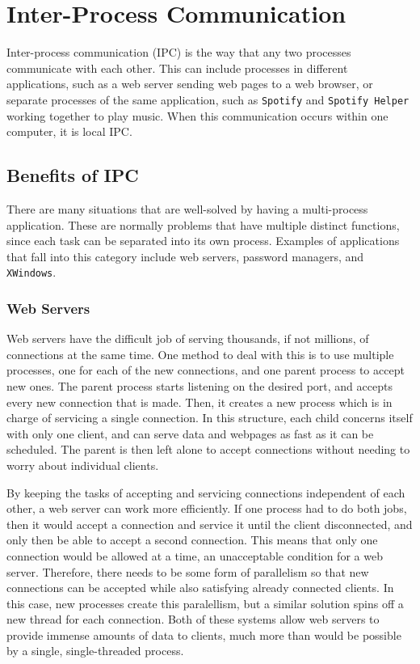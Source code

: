 \chapter{Inter-Process Communication}
\label{sec:interProcessCommunication}

Inter-process communication (IPC) is the way that any two processes communicate with each other.  This can include processes in different applications, such as a web server sending web pages to a web browser, or separate processes of the same application, such as \texttt{Spotify} and \texttt{Spotify Helper} working together to play music.  When this communication occurs within one computer, it is local IPC.


\section{Benefits of IPC}
\label{sec:benefitsOfIPC}
There are many situations that are well-solved by having a multi-process application.  These are normally problems that have multiple distinct functions, since each task can be separated into its own process.  Examples of applications that fall into this category include web servers, password managers, and \texttt{XWindows}.

\subsection{Web Servers}
\label{sec:webServers}
Web servers have the difficult job of serving thousands, if not millions, of connections at the same time.  One method to deal with this is to use multiple processes, one for each of the new connections, and one parent process to accept new ones.  The parent process starts listening on the desired port, and accepts every new connection that is made.  Then, it creates a new process which is in charge of servicing a single connection.  In this structure, each child concerns itself with only one client, and can serve data and webpages as fast as it can be scheduled.  The parent is then left alone to accept connections without needing to worry about individual clients.

By keeping the tasks of accepting and servicing connections independent of each other, a web server can work more efficiently.  If one process had to do both jobs, then it would accept a connection and service it until the client disconnected, and only then be able to accept a second connection.  This means that only one connection would be allowed at a time, an unacceptable condition for a web server.  Therefore, there needs to be some form of parallelism so that new connections can be accepted while also satisfying already connected clients.  In this case, new processes create this paralellism, but a similar solution spins off a new thread for each connection.  Both of these systems allow web servers to provide immense amounts of data to clients, much more than would be possible by a single, single-threaded process.

